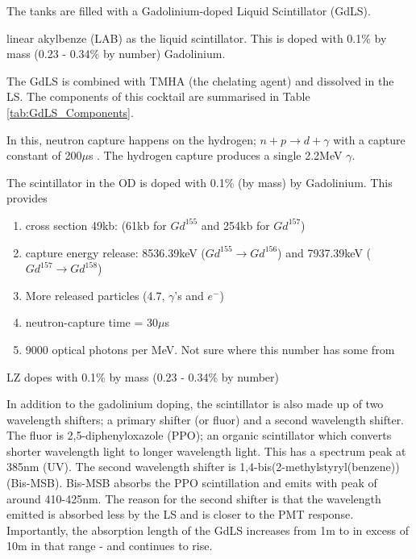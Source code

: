 \par
The tanks are filled with a Gadolinium-doped Liquid Scintillator (GdLS).

linear akylbenze (LAB) as the liquid scintillator.
This is doped with 0.1\% by mass (0.23 - 0.34\% by number) Gadolinium.

\par
The GdLS is combined with TMHA (the chelating agent) and dissolved in the LS.
The components of this cocktail are summarised in Table \ref{tab:GdLS_Components}.



In this, neutron capture happens on the hydrogen; $n + p \xrightarrow{} d + \gamma$ with a capture constant of 200$\mu$s \cite{LZ_TechnicalDesignReview_ref}.
The hydrogen capture produces a single 2.2MeV $\gamma$.
\par
The scintillator in the OD is doped with 0.1\% (by mass) by Gadolinium.
This provides 

\begin{enumerate}
    \item cross section 49kb: (61kb for $Gd^{155}$ and 254kb for $Gd^{157}$)
    \item capture energy release: 8536.39keV ($Gd^{155} \xrightarrow{} Gd^{156}$) and 7937.39keV ($Gd^{157} \xrightarrow{} Gd^{158}$)
    \item More released particles (4.7, $\gamma$'s and $e^{-}$)
    \item neutron-capture time = 30$\mu$s
    \item 9000 optical photons per MeV. Not sure where this number has some from
\end{enumerate}

\par
LZ dopes with 0.1\% by mass (0.23 - 0.34\% by number)

\par
In addition to the gadolinium doping, the scintillator is also made up of two wavelength shifters; a primary shifter (or fluor) and a second wavelength shifter.
The fluor is 2,5-diphenyloxazole (PPO); an organic scintillator which converts shorter wavelength light to longer wavelength light. 
This has a spectrum peak at 385nm (UV).
The second wavelength shifter is 1,4-bis(2-methylstyryl(benzene)) (Bis-MSB). 
Bis-MSB absorbs the PPO scintillation and emits with peak of around 410-425nm.
The reason for the second shifter is that the wavelength emitted is absorbed less by the LS and is closer to the PMT response.
Importantly, the absorption length of the GdLS increases from 1m to in excess of 10m in that range - and continues to rise.

